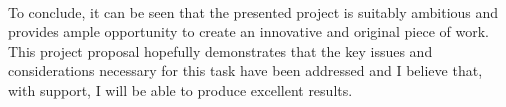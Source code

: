 \documentclass[]{article}
\begin{document}
\paragraph{}
To conclude, it can be seen that the presented project is suitably ambitious and provides ample opportunity to create an innovative and original piece of work. This project proposal hopefully demonstrates that the key issues and considerations necessary for this task have been addressed and I believe that, with support, I will be able to produce excellent results.

\printbibliography
\end{document}
